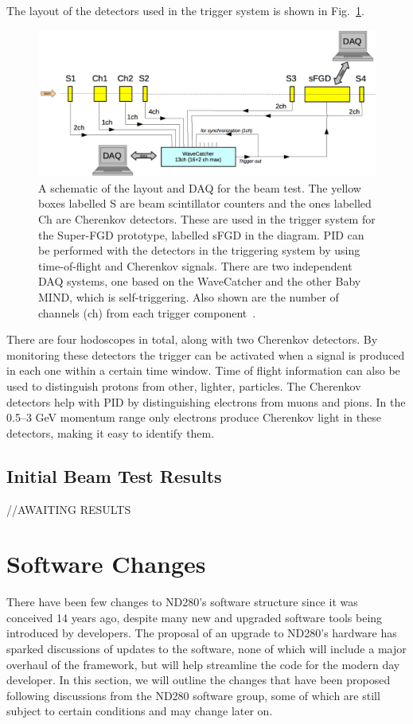 \documentclass[aps,pra,12pt,notitlepage,tightenlines]{revtex4-1}
\begin{document}
The layout of the detectors used in the trigger system is shown in Fig.\ \ref{fig:daq}.
\begin{figure}
 \includegraphics[scale=0.55]{daq}
 \caption{A schematic of the layout and DAQ for the beam test. The yellow boxes labelled S are beam scintillator counters and the ones labelled Ch are Cherenkov detectors. These are used in the trigger system for the Super-FGD prototype, labelled sFGD in the diagram. PID can be performed with the detectors in the triggering system by using time-of-flight and Cherenkov signals. There are two independent DAQ systems, one based on the WaveCatcher and the other Baby MIND, which is self-triggering. Also shown are the number of channels (ch) from each trigger component~\cite{Korzenev2018}.}
 \label{fig:daq}
\end{figure}
There are four hodoscopes in total, along with two Cherenkov detectors. By monitoring these detectors the trigger can be activated when a signal is produced in each one within a certain time window. Time of flight information can also be used to distinguish protons from other, lighter, particles. The Cherenkov detectors help with PID by distinguishing electrons from muons and pions. In the 0.5--3 GeV momentum range only electrons produce Cherenkov light in these detectors, making it easy to identify them.

\subsection{Initial Beam Test Results}
//AWAITING RESULTS

\section{Software Changes}
There have been few changes to ND280's software structure since it was conceived 14 years ago, despite many new and upgraded software tools being introduced by developers. The proposal of an upgrade to ND280's hardware has sparked discussions of updates to the software, none of which will include a major overhaul of the framework, but will help streamline the code for the modern day developer. In this section, we will outline the changes that have been proposed following discussions from the ND280 software group, some of which are still subject to certain conditions and may change later on.
\end{document}
